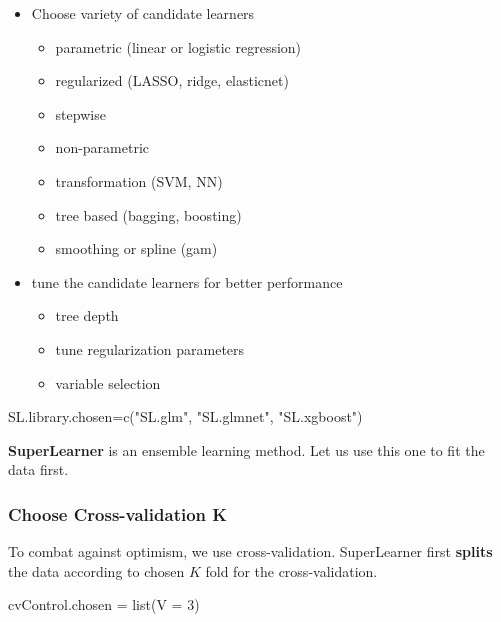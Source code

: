 \documentclass[
]{book}
\newenvironment{Shaded}{\begin{snugshade}}{\end{snugshade}}
\newcommand{\AttributeTok}[1]{\textcolor[rgb]{0.77,0.63,0.00}{#1}}
\newcommand{\DecValTok}[1]{\textcolor[rgb]{0.00,0.00,0.81}{#1}}
\newcommand{\FunctionTok}[1]{\textcolor[rgb]{0.00,0.00,0.00}{#1}}
\newcommand{\NormalTok}[1]{#1}
\newcommand{\OtherTok}[1]{\textcolor[rgb]{0.56,0.35,0.01}{#1}}
\newcommand{\StringTok}[1]{\textcolor[rgb]{0.31,0.60,0.02}{#1}}
\providecommand{\tightlist}{%
  \setlength{\itemsep}{0pt}\setlength{\parskip}{0pt}}
\begin{document}
\begin{itemize}
\tightlist
\item
  Choose variety of candidate learners

  \begin{itemize}
  \tightlist
  \item
    parametric (linear or logistic regression)
  \item
    regularized (LASSO, ridge, elasticnet)
  \item
    stepwise
  \item
    non-parametric
  \item
    transformation (SVM, NN)
  \item
    tree based (bagging, boosting)
  \item
    smoothing or spline (gam)
  \end{itemize}
\item
  tune the candidate learners for better performance

  \begin{itemize}
  \tightlist
  \item
    tree depth
  \item
    tune regularization parameters
  \item
    variable selection
  \end{itemize}
\end{itemize}

\begin{Shaded}
\begin{Highlighting}[]
\NormalTok{SL.library.chosen}\OtherTok{=}\FunctionTok{c}\NormalTok{(}\StringTok{"SL.glm"}\NormalTok{, }\StringTok{"SL.glmnet"}\NormalTok{, }\StringTok{"SL.xgboost"}\NormalTok{)}
\end{Highlighting}
\end{Shaded}

\textbf{SuperLearner} is an ensemble learning method. Let us use this one to fit the data first.

\hypertarget{choose-cross-validation-k}{%
\subsubsection{Choose Cross-validation K}\label{choose-cross-validation-k}}

To combat against optimism, we use cross-validation. SuperLearner first \textbf{splits} the data according to chosen \(K\) fold for the cross-validation.

\begin{Shaded}
\begin{Highlighting}[]
\NormalTok{cvControl.chosen }\OtherTok{=} \FunctionTok{list}\NormalTok{(}\AttributeTok{V =} \DecValTok{3}\NormalTok{)}
\end{Highlighting}
\end{Shaded}
\end{document}
